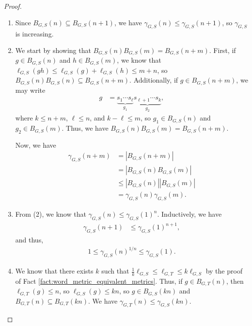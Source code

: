 \begin{proof}\hfill
  \begin{enumerate}[(1)]
    \item Since $B_{G,S}\left(n\right)\subseteq B_{G,S}\left(n+1\right)$, we have $\gamma_{G,S}\left(n\right) \leq \gamma_{G,S}\left(n+1\right)$, so $\gamma_{G,S}$ is increasing.
    \item We start by showing that $B_{G,S}\left(n\right)B_{G,S}\left(m\right) = B_{G,S}\left(n+m\right)$. First, if $g\in B_{G,S}\left(n\right)$ and $h\in B_{G,S}\left(m\right)$, we know that $\ell_{G,S}\left(gh\right) \leq \ell_{G,S}\left(g\right) + \ell_{G,S}\left(h\right)\leq m+n$, so $B_{G,S}\left(n\right)B_{G,S}\left(n\right) \subseteq B_{G,S}\left(n+m\right)$. Additionally, if $g\in B_{G,S}\left(n+m\right)$, we may write
      \begin{align*}
        g &= \underbrace{s_{1}\cdots s_{\ell}}_{g_1}\underbrace{s_{\ell+1}\cdots s_{k}}_{g_2},
      \end{align*}
      where $k\leq n+m$, $\ell \leq n$, and $k-\ell \leq m$, so $g_1\in B_{G,S}\left(n\right)$ and $g_2\in B_{G,S}\left(m\right)$. Thus, we have $B_{G,S}\left(n\right)B_{G,S}\left(m\right) = B_{G,S}\left(n+m\right)$.\newline

      Now, we have
      \begin{align*}
        \gamma_{G,S}\left(n+m\right) &= \left\vert B_{G,S}\left(n+m\right) \right\vert\\
                                     &= \left\vert B_{G,S}\left(n\right)B_{G,S}\left(m\right) \right\vert\\
                                     &\leq \left\vert B_{G,S}\left(n\right) \right\vert\left\vert B_{G,S}\left(m\right) \right\vert\\
                                     &= \gamma_{G,S}\left(n\right)\gamma_{G,S}\left(m\right).
      \end{align*}
    \item From (2), we know that $\gamma_{G,S}\left(n\right) \leq \gamma_{G,S}\left(1\right)^{n}$. Inductively, we have
      \begin{align*}
        \gamma_{G,S}\left(n+1\right) &\leq \gamma_{G,S}\left(1\right)^{n+1},
      \end{align*}
      and thus,
      \begin{align*}
        1 \leq \gamma_{G,S}\left(n\right)^{1/n}\leq \gamma_{G,S}\left(1\right).
      \end{align*}
    \item We know that there exists $k$ such that $\frac{1}{k}\ell_{G,S} \leq \ell_{G,T}\leq k\ell_{G,S}$ by the proof of Fact \ref{fact:word_metric_equivalent_metrics}. Thus, if $g\in B_{G,T}\left(n\right)$, then $\ell_{G,T}\left(g\right) \leq n$, so $\ell_{G,S}\left(g\right) \leq kn$, so $g\in B_{G,S}\left(kn\right)$ and $B_{G,T}\left(n\right)\subseteq B_{G,T}\left(kn\right)$. We have $\gamma_{G,T}\left(n\right)\leq \gamma_{G,S}\left(kn\right)$.\newline


\end{enumerate}
\end{proof}
